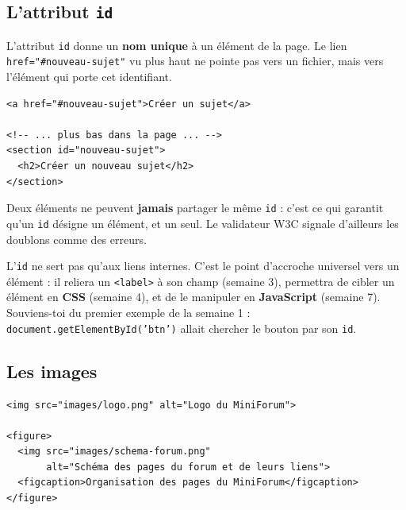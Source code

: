 \documentclass[a4paper,11pt]{article}
\begin{document}
\subsection{L'attribut \texttt{id}}

L'attribut \texttt{id} donne un \textbf{nom unique} à un élément de la page. Le lien \texttt{href="\#nouveau-sujet"} vu plus haut ne pointe pas vers un fichier, mais vers l'élément qui porte cet identifiant.

\begin{lstlisting}[language=HTML5, caption={Un id sert de cible à un lien interne}]
<a href="#nouveau-sujet">Créer un sujet</a>

<!-- ... plus bas dans la page ... -->
<section id="nouveau-sujet">
  <h2>Créer un nouveau sujet</h2>
</section>
\end{lstlisting}

\begin{tcolorbox}[attention, title={Règle d'or --- un \texttt{id} est unique dans la page}]
Deux éléments ne peuvent \textbf{jamais} partager le même \texttt{id} : c'est ce qui garantit qu'un \texttt{id} désigne un élément, et un seul. Le validateur W3C signale d'ailleurs les doublons comme des erreurs.
\end{tcolorbox}

\begin{tcolorbox}[astuce, title={L'\texttt{id}, un point d'accroche pour toute l'année}]
L'\texttt{id} ne sert pas qu'aux liens internes. C'est le point d'accroche universel vers un élément : il reliera un \texttt{<label>} à son champ (semaine 3), permettra de cibler un élément en \textbf{CSS} (semaine 4), et de le manipuler en \textbf{JavaScript} (semaine 7). Souviens-toi du premier exemple de la semaine 1 : \texttt{document.getElementById('btn')} allait chercher le bouton par son \texttt{id}.
\end{tcolorbox}

\subsection{Les images}

\begin{lstlisting}[language=HTML5, caption={Insérer une image, avec ou sans légende}]
<img src="images/logo.png" alt="Logo du MiniForum">

<figure>
  <img src="images/schema-forum.png"
       alt="Schéma des pages du forum et de leurs liens">
  <figcaption>Organisation des pages du MiniForum</figcaption>
</figure>
\end{lstlisting}
\end{document}
